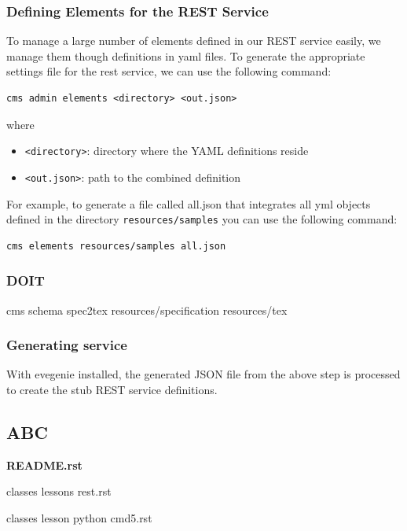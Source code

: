 \documentclass[10pt]{article}
\begin{document}
\subsubsection{Defining Elements for the REST Service}

To manage a large number of elements defined in our REST service
easily, we manage them though definitions in yaml files. To generate
the appropriate settings file for the rest service, we can use the
following command:

\begin{verbatim}
cms admin elements <directory> <out.json>
\end{verbatim}

where

\begin{itemize}
\item \verb+<directory>+: directory where the YAML definitions reside
\item \verb+<out.json>+: path to the combined definition
\end{itemize}

For example, to generate a file called all.json that integrates all
yml objects defined in the directory \verb+resources/samples+ you can
use the following command:

\begin{verbatim}
cms elements resources/samples all.json
\end{verbatim}

\subsubsection{DOIT}


cms schema spec2tex resources/specification resources/tex

\subsubsection{Generating service}

With evegenie installed, the generated JSON file from the above step
is processed to create the stub REST service definitions.


\subsection{ABC}
{\bf README.rst}

classes lessons rest.rst

classes lesson python cmd5.rst

\end{document}
